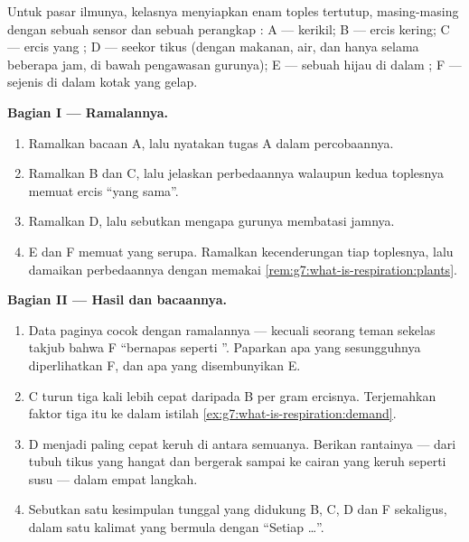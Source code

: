 \begin{problem}\label{pb:g7:what-is-respiration:1}
Untuk pasar ilmunya, kelasnya menyiapkan enam toples tertutup,
masing-masing dengan sebuah sensor  dan sebuah perangkap : A --- kerikil; B --- ercis kering; C --- ercis yang
; D --- seekor tikus (dengan makanan, air, dan hanya selama
beberapa jam, di bawah pengawasan gurunya); E --- sebuah 
hijau di dalam ; F ---  sejenis di dalam kotak yang
gelap.

\medskip\noindent\textbf{Bagian I --- Ramalannya.}
\begin{enumerate}
  \item Ramalkan bacaan A, lalu nyatakan tugas A dalam percobaannya.
  \item Ramalkan B dan C, lalu jelaskan perbedaannya walaupun kedua
        toplesnya memuat ercis ``yang sama''.
  \item Ramalkan D, lalu sebutkan mengapa gurunya membatasi jamnya.
  \item E dan F memuat  yang serupa. Ramalkan kecenderungan
         tiap toplesnya, lalu damaikan perbedaannya dengan
        memakai \cref{rem:g7:what-is-respiration:plants}.
\end{enumerate}

\medskip\noindent\textbf{Bagian II --- Hasil dan bacaannya.}
\begin{enumerate}[resume]
  \item Data paginya cocok dengan ramalannya --- kecuali seorang teman
        sekelas takjub bahwa  F ``bernapas seperti ''.
        Paparkan apa yang sesungguhnya diperlihatkan F, dan apa yang
        disembunyikan E.
  \item {} C turun tiga kali lebih cepat daripada  B per
        gram ercisnya. Terjemahkan faktor tiga itu ke dalam istilah
        \cref{ex:g7:what-is-respiration:demand}.
  \item {} D menjadi paling cepat keruh di antara semuanya.
        Berikan rantainya --- dari tubuh tikus yang hangat dan bergerak
        sampai ke cairan yang keruh seperti susu --- dalam empat
        langkah.
  \item Sebutkan satu kesimpulan tunggal yang didukung B, C, D dan F
        sekaligus, dalam satu kalimat yang bermula dengan ``Setiap
        \dots''.
\end{enumerate}


\end{problem}
